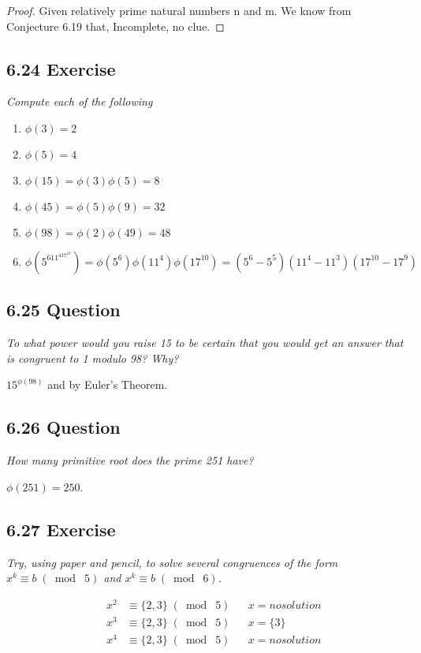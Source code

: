 \documentclass{article}
\begin{document}
\begin{proof}
Given relatively prime natural numbers n and m. We know from Conjecture 6.19 that,
Incomplete, no clue.
\end{proof}

\subsection*{6.24 Exercise} 
\quad \textit{Compute each of the following}
\begin{enumerate}
    \item $\phi(3) = 2$
    \item $\phi(5) = 4$
    \item $\phi(15) = \phi(3)\phi(5) = 8$
    \item $\phi(45) = \phi(5)\phi(9) = 32$
    \item $\phi(98) = \phi(2)\phi(49) = 48$
    \item $\phi(5^611^417^{10}) = \phi(5^6)\phi(11^4)\phi(17^{10}) = (5^6 - 5^5)(11^4-11^3)(17^{10}-17^9)$
\end{enumerate}

\subsection*{6.25 Question} 
\quad \textit{To what power would you raise 15 to be certain that you would get an answer that is congruent to 1 modulo 98? Why?}

$15^{\phi(98)}$ and by Euler's Theorem.

\subsection*{6.26 Question} 
\quad \textit{How many primitive root does the prime 251 have?}

$\phi(251) = 250$.

\subsection*{6.27 Exercise} 
\quad \textit{Try, using paper and pencil, to solve several congruences of the form $x^k \equiv b \;(\bmod\; 5)$ and $x^k \equiv b \;(\bmod\; 6)$.}

\begin{align*}
    &&x^2 &\equiv \{2,3\} \;(\bmod\; 5)&& x = no solution\\
    &&x^3 &\equiv \{2,3\} \;(\bmod\; 5)&& x = \{3\}\\
    &&x^4 &\equiv \{2,3\} \;(\bmod\; 5)&& x = no solution\\
\end{align*}
\end{document}
